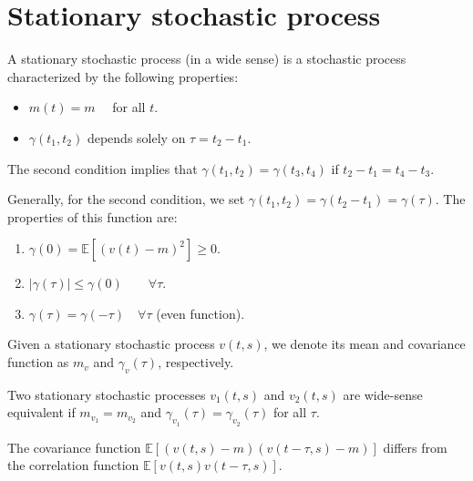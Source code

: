 \section{Stationary stochastic process}

\begin{definition}
    A stationary stochastic process (in a wide sense) is a stochastic process characterized by the following properties:
    \begin{itemize}
        \item $m(t)=m\quad$ for all $t$. 
        \item $\gamma(t_1,t_2)$ depends solely on $\tau=t_2-t_1$.
    \end{itemize}
\end{definition}
The second condition implies that $\gamma(t_1,t_2)=\gamma(t_3,t_4)$ if $t_2-t_1=t_4-t_3$. 

Generally, for the second condition, we set $\gamma(t_1,t_2)=\gamma(t_2-t_1)=\gamma(\tau)$. 
The properties of this function are:
\begin{enumerate}
    \item $\gamma(0)=\mathbb{E}\left[{\left(v(t)-m\right)}^2\right]\geq 0$.
    \item $\left\lvert \gamma(\tau) \right\rvert \leq \gamma(0) \qquad \forall\tau$.
    \item $\gamma(\tau)=\gamma(-\tau) \quad\forall\tau$ (even function). 
\end{enumerate}

\begin{property}
    Given a stationary stochastic process $v(t,s)$, we denote its mean and covariance function as $m_v$ and $\gamma_v(\tau)$, respectively.
\end{property}
\begin{property}
    Two stationary stochastic processes $v_1(t,s)$ and $v_2(t,s)$ are wide-sense equivalent if $m_{v_1}=m_{v_2}$ and $\gamma_{v_1}(\tau)=\gamma_{v_2}(\tau)$ for all $\tau$.
\end{property}
\begin{property}
    The covariance function $\mathbb{E}\left[ \left(v(t,s)-m\right)\left(v(t-\tau,s)-m\right) \right]$ differs from the correlation function $\mathbb{E}\left[ v(t,s)v(t-\tau,s) \right]$.
\end{property}

